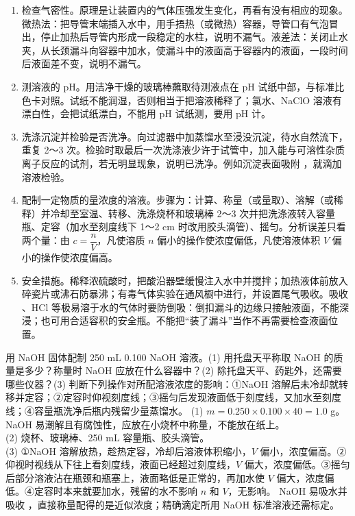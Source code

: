 \begin{enumerate}
\item 检查气密性。原理是让装置内的气体压强发生变化，再看有没有相应的现象。微热法：把导管末端插入水中，用手捂热（或微热）容器，导管口有气泡冒出，停止加热后导管内形成一段稳定的水柱，说明不漏气。液差法：关闭止水夹，从长颈漏斗向容器中加水，使漏斗中的液面高于容器内的液面，一段时间后液面差不变，说明不漏气。
\item 测溶液的 pH。用洁净干燥的玻璃棒蘸取待测液点在 pH 试纸中部，与标准比色卡对照。试纸不能润湿，否则相当于把溶液稀释了；氯水、NaClO 溶液有漂白性，会把试纸漂白，不能用 pH 试纸测，要用 pH 计。
\item 洗涤沉淀并检验是否洗净。向过滤器中加蒸馏水至浸没沉淀，待水自然流下，重复 2～3 次。检验时取最后一次洗涤液少许于试管中，加入能与可溶性杂质离子反应的试剂，若无明显现象，说明已洗净。例如沉淀表面吸附 ，就滴加  溶液检验。
\item 配制一定物质的量浓度的溶液。步骤为：计算、称量（或量取）、溶解（或稀释）并冷却至室温、转移、洗涤烧杯和玻璃棒 2～3 次并把洗涤液转入容量瓶、定容（加水至刻度线下 1～2 cm 时改用胶头滴管）、摇匀。分析误差只看两个量：由 $c=\dfrac{n}{V}$，凡使溶质 $n$ 偏小的操作使浓度偏低，凡使溶液体积 $V$ 偏小的操作使浓度偏高。
\item 安全措施。稀释浓硫酸时，把酸沿器壁缓慢注入水中并搅拌；加热液体前放入碎瓷片或沸石防暴沸；有毒气体实验在通风橱中进行，并设置尾气吸收。吸收 、HCl 等极易溶于水的气体时要防倒吸：倒扣漏斗的边缘只接触液面，不能深浸；也可用合适容积的安全瓶。不能把“装了漏斗”当作不再需要检查液面位置。
\end{enumerate}

\begin{liti}[基础]
用 NaOH 固体配制 250 mL 0.100\molL{} NaOH 溶液。(1) 用托盘天平称取 NaOH 的质量是多少？称量时 NaOH 应放在什么容器中？(2) 除托盘天平、药匙外，还需要哪些仪器？(3) 判断下列操作对所配溶液浓度的影响：①NaOH 溶解后未冷却就转移并定容；②定容时仰视刻度线；③摇匀后发现液面低于刻度线，又加水至刻度线；④容量瓶洗净后瓶内残留少量蒸馏水。
\tcblower
\jie (1) $m=0.250\times0.100\times40=1.0$ g。NaOH 易潮解且有腐蚀性，应放在小烧杯中称量，不能放在纸上。\\
(2) 烧杯、玻璃棒、250 mL 容量瓶、胶头滴管。\\
(3) ①NaOH 溶解放热，趁热定容，冷却后溶液体积缩小，$V$ 偏小，浓度偏高。②仰视时视线从下往上看刻度线，液面已经超过刻度线，$V$ 偏大，浓度偏低。③摇匀后部分溶液沾在瓶颈和瓶塞上，液面略低是正常的，再加水使 $V$ 偏大，浓度偏低。④定容时本来就要加水，残留的水不影响 $n$ 和 $V$，无影响。
NaOH 易吸水并吸收 ，直接称量配得的是近似浓度；精确滴定所用 NaOH 标准溶液还需标定。
\end{liti}

